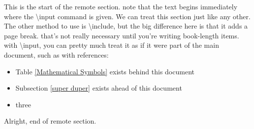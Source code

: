 This is the start of the remote section. note that the text begins immediately where the \textbackslash input command is given. We can treat this section just like any other. The other method to use is \textbackslash include, but the big difference here is that it adds a page break. that's not really necessary until you're writing book-length items. with \textbackslash input, you can pretty much treat it as if it were part of the main document, such as with references:

\begin{itemize}
\item Table \ref{Mathematical Symbols} exists behind this document
\item Subsection \ref{super duper} exists ahead of this document
\item three
\end{itemize}

Alright, end of remote section.